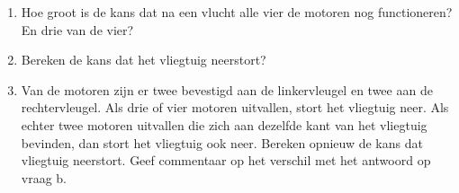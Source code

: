 
\begin{enumerate}[label=(\alph*)]
    \item Hoe groot is de kans dat na een vlucht alle vier de motoren nog functioneren? En drie van de vier?
    \answer{

    }

    \item Bereken de kans dat het vliegtuig neerstort?
    \answer{
        
    }

    \item Van de motoren zijn er twee bevestigd aan de linkervleugel en twee aan de rechtervleugel.
    Als drie of vier motoren uitvallen, stort het vliegtuig neer.
    Als echter twee motoren uitvallen die zich aan dezelfde kant van het vliegtuig bevinden, dan stort het vliegtuig ook neer.
    Bereken opnieuw de kans dat vliegtuig neerstort.
    Geef commentaar op het verschil met het antwoord op vraag b.
    \answer{
        
    }
\end{enumerate}